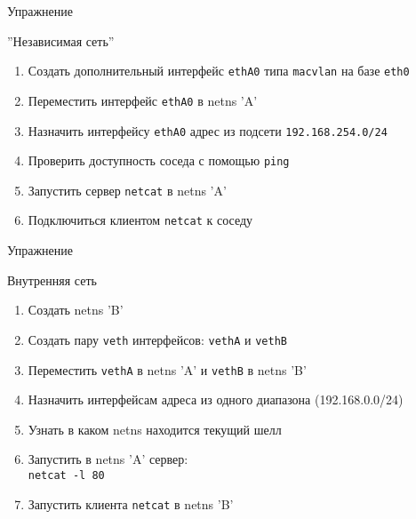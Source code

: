 \begin{frame}[fragile]{Упражнение}
    \begin{block}{''Независимая сеть''}
        \begin{enumerate}
            \item Создать дополнительный интерфейс {\tt ethA0} типа {\tt macvlan} на базе {\tt eth0}
            \item Переместить интерфейс {\tt ethA0} в netns 'A'
            \item Назначить интерфейсу {\tt ethA0} адрес из подсети {\tt 192.168.254.0/24}
            \item Проверить доступность соседа с помощью {\tt ping} 
            \item Запустить сервер {\tt netcat} в netns 'A'
            \item Подключиться клиентом {\tt netcat} к соседу
        \end{enumerate}
    \end{block}
\end{frame}

\begin{frame}[fragile]{Упражнение}
    \begin{block}{Внутренняя сеть}
        \begin{enumerate}
            \item Создать netns 'B'
            \item Создать пару {\tt veth} интерфейсов: {\tt vethA} и {\tt vethB}
            \item Переместить {\tt vethA} в netns 'A' и {\tt vethB} в netns 'B'
            \item Назначить интерфейсам адреса из одного диапазона (192.168.0.0/24)
            \item Узнать в каком netns находится текущий шелл
            \item Запустить в netns 'A' сервер:\\
                {\tt netcat -l 80}
            \item Запустить клиента {\tt netcat} в netns 'B'
        \end{enumerate}
    \end{block}
\end{frame}

